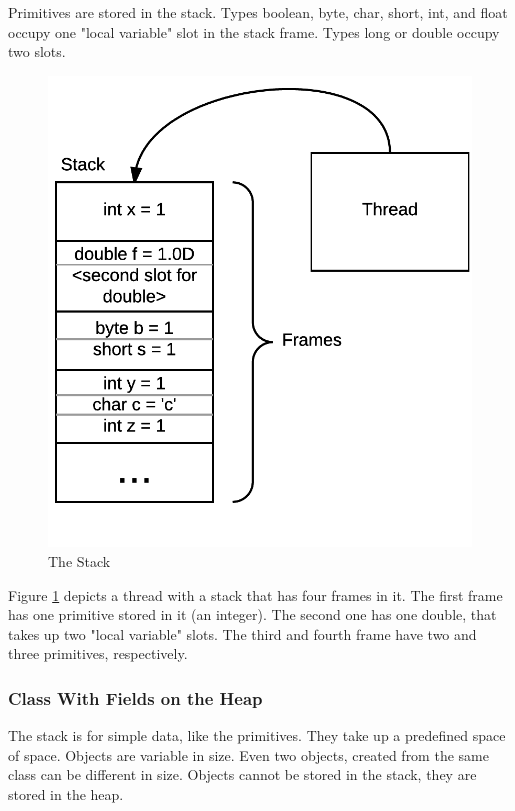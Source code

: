 Primitives are stored in the stack. Types boolean, byte, char, short, int, and float occupy one "local variable" slot in the stack frame. Types long or double occupy two slots. \cite{gosling}
\begin{figure}[H]\centering
\includegraphics[width=0.9\linewidth, frame]{images/stack}
\caption{The Stack}
\label{fig:stack}
\end{figure}
Figure \ref{fig:stack} depicts a thread with a stack that has four frames in it. The first frame has one primitive stored in it (an integer). The second one has one double, that takes up two "local variable" slots. The third and fourth frame have two and three primitives, respectively.

\subsubsection{Class With Fields on the Heap}
The stack is for simple data, like the primitives. They take up a predefined space of space. Objects are variable in size. Even two objects, created from the same class can be different in size. Objects cannot be stored in the stack, they are stored in the heap.

